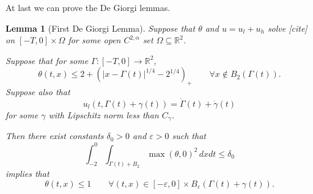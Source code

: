 \documentclass[11pt]{amsart}
\newtheorem{lemma}[theorem]{Lemma}
\theoremstyle{remark}
\newcommand{\R}{\mathbb{R}}
\newcommand{\eps}{\varepsilon}
\newcommand{\paren}[1]{\left( #1 \right)}
\newcommand{\ulow}{u_l}
\newcommand{\uhigh}{u_h}
\begin{document}
At last we can prove the De Giorgi lemmas.  

\begin{lemma}[First De Giorgi Lemma]
Suppose that $\theta$ and $u = \ulow + \uhigh$ solve [cite] on $[-T,0]\times \Omega$ for some open $C^{2,\alpha}$ set $\Omega \subseteq \R^2$.  

Suppose that for some $\Gamma:[-T,0]\to \R^2$, 
\[ \theta(t,x) \leq 2 + \paren{|x-\Gamma(t)|^{1/4}-2^{1/4}}_+ \qquad \forall x \notin B_2(\Gamma(t)). \]
Suppose also that
\[ \ulow(t,\Gamma(t)+\gamma(t)) = \dot{\Gamma}(t) + \dot{\gamma}(t) \]
for some $\gamma$ with Lipschitz norm less than $C_\gamma$.  

Then there exist constants $\delta_0>0$ and $\eps > 0$ such that
\[ \int_{-2}^0 \int_{\Gamma(t)+B_2} \max(\theta,0)^2 \,dxdt \leq \delta_0 \]
implies that
\[ \theta(t,x) \leq 1 \qquad \forall (t,x) \in [-\eps,0]\times B_\eps(\Gamma(t) + \gamma(t)). \]

\end{lemma}
\end{document}
